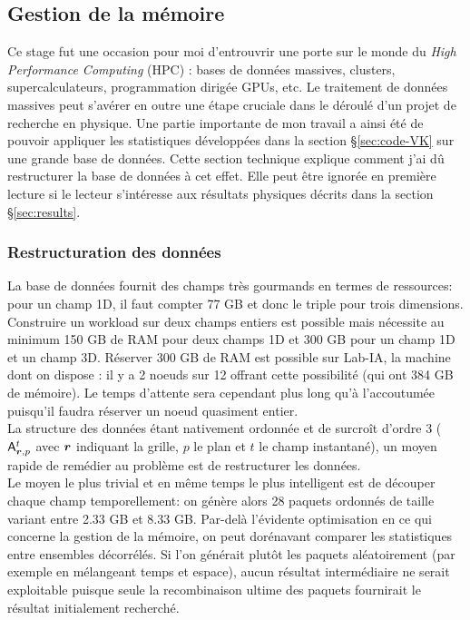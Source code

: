 \documentclass[13pt, a4paper]{extarticle}
\begin{document}
\subsection{Gestion de la mémoire}

\noindent Ce stage fut une occasion pour moi d'entrouvrir une porte sur le monde du 
\emph{High Performance Computing} (HPC) : bases de données massives, clusters, 
supercalculateurs, programmation dirigée GPUs, etc. Le traitement de données 
massives peut s'avérer en outre une étape cruciale dans le déroulé d'un projet 
de recherche en physique. Une partie importante de mon travail a ainsi été de 
pouvoir appliquer les statistiques développées dans 
la section \S \ref{sec:code-VK} sur une grande base de données. Cette section 
technique explique comment j'ai dû restructurer 
la base de données à cet effet. Elle peut être ignorée en première lecture si 
le lecteur s'intéresse
aux résultats physiques décrits dans la section \S \ref{sec:results}.

\subsubsection{Restructuration des données}
\noindent La base de données fournit des champs très gourmands en termes de ressources:
pour un champ 1D, il faut compter 77 GB et donc le triple pour trois dimensions.
Construire un workload sur deux champs entiers est possible mais nécessite
au minimum 150 GB de RAM pour deux champs 1D et 300 GB pour un champ 1D et un champ 3D.
Réserver 300 GB de RAM est possible sur Lab-IA, la machine dont on dispose : 
il y a 2 noeuds sur 12 offrant 
cette possibilité (qui ont 384 GB de mémoire). Le temps d'attente sera cependant 
plus long qu'à l'accoutumée puisqu'il
faudra réserver un noeud quasiment entier.\\
La structure des données étant nativement ordonnée et de surcroît d'ordre 3 
($\mathsf{A}_{\boldsymbol{r},p}^t$ avec $\boldsymbol{r}$ indiquant la grille, $p$ le plan et $t$ le champ instantané), 
un moyen rapide de remédier au problème est de restructurer les données.\\

\noindent Le moyen le plus trivial et en même temps le plus intelligent est de découper
chaque champ temporellement: on génère alors 28 paquets ordonnés de taille variant
entre 2.33 GB et 8.33 GB. Par-delà l'évidente optimisation en ce qui concerne la
gestion de la mémoire, on peut dorénavant comparer les statistiques entre ensembles décorrélés. 
Si l'on générait plutôt les paquets aléatoirement (par exemple en mélangeant temps et espace), 
aucun résultat intermédiaire ne serait
exploitable puisque seule la recombinaison ultime des paquets fournirait le résultat
initialement recherché.
\end{document}
